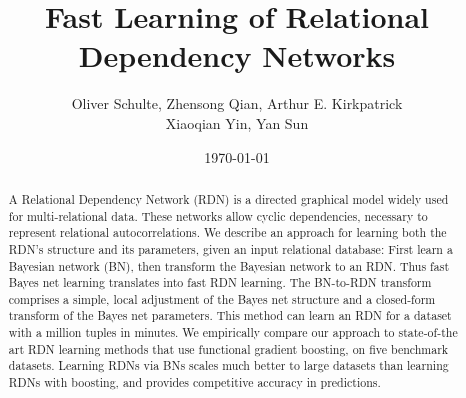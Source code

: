 \documentclass[runningheads,a4paper]{llncs}
\title{Fast Learning of Relational Dependency Networks}
\author{Oliver Schulte, Zhensong Qian, Arthur E. Kirkpatrick\\ Xiaoqian Yin, Yan Sun 
}
\institute{ School of Computing Science, Simon Fraser University, Canada\\
\{oschulte,zqian,ted,xiaoqian\_yin,sunyans\}@sfu.ca\\}
\date{\today}
\begin{document}
\maketitle



\begin{abstract} 
A Relational Dependency Network (RDN) is a directed graphical model widely used for multi-relational data. These networks allow cyclic dependencies, necessary to represent relational autocorrelations. We describe an approach for learning both the RDN's structure and its parameters, given an input relational database: First learn a Bayesian network (BN), then transform the Bayesian network to an RDN. Thus fast Bayes net learning translates into fast RDN learning. The BN-to-RDN transform comprises a simple, local adjustment of the Bayes net structure and a closed-form transform of the Bayes net parameters. This method can learn an RDN for a dataset with a million tuples in minutes. We empirically compare our approach to state-of-the art RDN learning methods that use functional gradient boosting, on five benchmark datasets. Learning RDNs via BNs scales much better to large datasets than learning RDNs with boosting, and provides competitive accuracy in predictions.\end{abstract}
\end{document}
